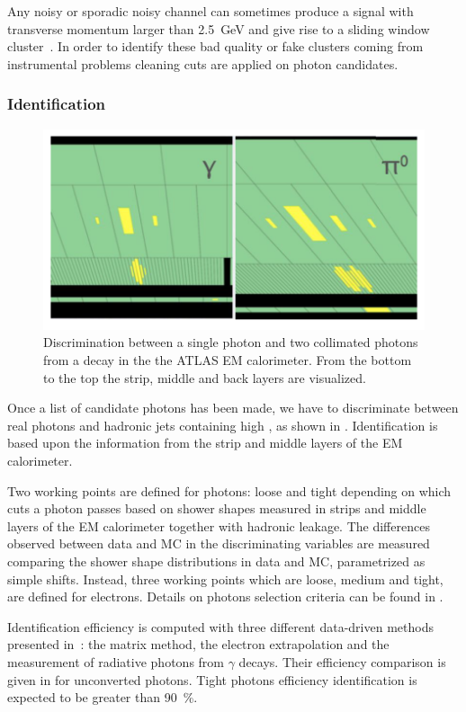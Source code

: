 Any noisy or sporadic noisy channel can sometimes produce a signal with transverse momentum larger than \SI{2.5}{\GeV} and give rise to a sliding window cluster~\cite{photons}. In order to identify these bad quality or fake clusters coming from instrumental problems cleaning cuts are applied on photon candidates. 

\subsubsection{Identification}
\begin{figure}[tp]
\centering
\includegraphics[width=.65\textwidth]{MCSample/pizerogamma}
\caption{Discrimination between a single photon and two collimated photons from a \pizero decay in the the ATLAS EM calorimeter. From the bottom to the top the strip, middle and back layers are visualized.}
\label{pizerogamma}
\end{figure}

Once a list of candidate photons has been made, we have to discriminate between real photons and hadronic jets containing high \pt \pizero, as shown in \Fig{\ref{pizerogamma}}. Identification is based upon the information from the strip and middle layers of the EM calorimeter.

Two working points are defined for photons: loose and tight depending on which cuts a photon passes based on shower shapes measured in strips and middle layers of the EM calorimeter together with hadronic leakage. The differences observed between data and MC in the discriminating variables are measured comparing the shower shape distributions in data and MC, parametrized as simple shifts. Instead, three working points which are loose, medium and tight, are defined for electrons. Details on photons selection criteria can be found in \cite[Sect. 4]{photons}.

Identification efficiency is computed with three different data-driven methods presented in~\cite{photons}: the matrix method, the electron extrapolation and the measurement of radiative photons from \mbox{\Zboson\rarrow\ellell$\gamma$} decays. Their efficiency comparison is given in \Fig{\ref{fig:phID}} for unconverted photons. Tight photons efficiency identification is expected to be greater than \SI{90}{\percent}.

